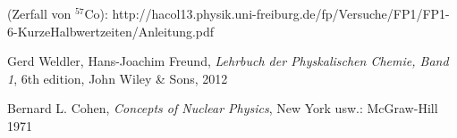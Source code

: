 \documentclass[12pt]{article}
\begin{document}
\newpage
\thispagestyle{empty}
\begin{thebibliography}{9}

 (Zerfall von $^{57}$Co): http://hacol13.physik.uni-freiburg.de/fp/Versuche/FP1/FP1-6-KurzeHalbwertzeiten/Anleitung.pdf
  
	Gerd Weldler, Hans-Joachim Freund,
	\emph{Lehrbuch der Physkalischen Chemie, Band 1},
	6th edition,
	John Wiley \& Sons,
	2012

Bernard L. Cohen,
\emph{Concepts of Nuclear Physics},
 New York usw.: McGraw-Hill 1971
  
  

\end{thebibliography}
\end{document}
